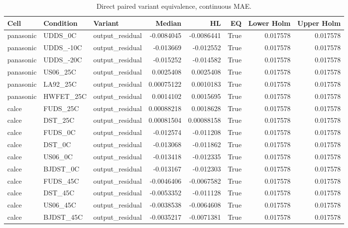 \begin{table}[!t]
\centering
\footnotesize
\caption{Direct paired variant equivalence, continuous MAE.}
\label{tab:reviewer-comparison-2}
\setlength{\tabcolsep}{3pt}
\begin{tabular}{ll p{} rrr rr}
\toprule
Cell & Condition & Variant & Median & HL & EQ & Lower Holm & Upper Holm \\
\midrule
panasonic & UDDS\_0C & output\_residual & -0.0084045 & -0.0086441 & True & 0.017578 & 0.017578 \\
panasonic & UDDS\_-10C & output\_residual & -0.013669 & -0.012552 & True & 0.017578 & 0.017578 \\
panasonic & UDDS\_-20C & output\_residual & -0.015252 & -0.014582 & True & 0.017578 & 0.017578 \\
panasonic & US06\_25C & output\_residual & 0.0025408 & 0.0025408 & True & 0.017578 & 0.017578 \\
panasonic & LA92\_25C & output\_residual & 0.00075122 & 0.0010183 & True & 0.017578 & 0.017578 \\
panasonic & HWFET\_25C & output\_residual & 0.0014102 & 0.0015695 & True & 0.017578 & 0.017578 \\
calce & FUDS\_25C & output\_residual & 0.00088218 & 0.0018628 & True & 0.017578 & 0.017578 \\
calce & DST\_25C & output\_residual & 0.00081504 & 0.00088158 & True & 0.017578 & 0.017578 \\
calce & FUDS\_0C & output\_residual & -0.012574 & -0.011208 & True & 0.017578 & 0.017578 \\
calce & DST\_0C & output\_residual & -0.013068 & -0.011862 & True & 0.017578 & 0.017578 \\
calce & US06\_0C & output\_residual & -0.013418 & -0.012335 & True & 0.017578 & 0.017578 \\
calce & BJDST\_0C & output\_residual & -0.013167 & -0.012303 & True & 0.017578 & 0.017578 \\
calce & FUDS\_45C & output\_residual & -0.0046406 & -0.0067582 & True & 0.017578 & 0.017578 \\
calce & DST\_45C & output\_residual & -0.0053352 & -0.011128 & True & 0.017578 & 0.017578 \\
calce & US06\_45C & output\_residual & -0.0038538 & -0.0064608 & True & 0.017578 & 0.017578 \\
calce & BJDST\_45C & output\_residual & -0.0035217 & -0.0071381 & True & 0.017578 & 0.017578 \\
\bottomrule
\end{tabular}
\end{table}
